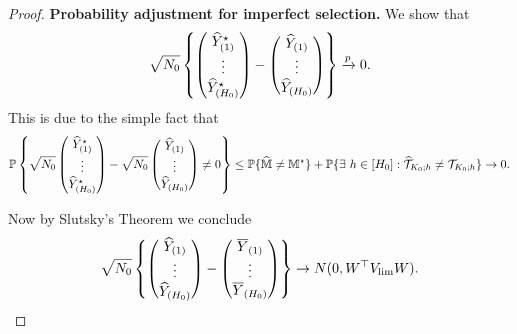 \documentclass[12pt]{article}
\begin{document}
\begin{proof}
\textbf{Probability adjustment for imperfect  selection.} We show that
\begin{align*}
    \sqrt{N_0}\left\{
        \begin{pmatrix}
        {\widehat{Y}}^\star_{(1)}\\
        \vdots \\
        {\widehat{Y}}^\star_{(H_0)}
        \end{pmatrix}
        - 
        \begin{pmatrix}
        {\widehat{Y}}_{(1)}\\
        \vdots \\
        {\widehat{Y}}_{(H_0)}
        \end{pmatrix} 
        \right\} \xrightarrow{p} 0.
\end{align*}
This is due to the simple fact that
\begin{align*}
    {\mathbb{P}}\left\{
        \sqrt{N_0}\begin{pmatrix}
        {\widehat{Y}}^\star_{(1)}\\
        \vdots \\
        {\widehat{Y}}^\star_{(H_0)}
        \end{pmatrix}
        - 
        \sqrt{N_0}\begin{pmatrix}
        {\widehat{Y}}_{(1)}\\
        \vdots \\
        {\widehat{Y}}_{(H_0)}
        \end{pmatrix} \neq 0
        \right\} \le {\mathbb{P}}\{\widehat{{\mathbb{M}}} \neq {\mathbb{M}}^\star\} + {\mathbb{P}}\{\exists~h \in [H_0]: \widehat{{\mathcal{T}}}_{K_0;h} \neq {{\mathcal{T}}}_{K_0;h}\} \to 0.
\end{align*}

Now by Slutsky's Theorem we conclude
\begin{align*}
        \sqrt{N_0}\left\{
        \begin{pmatrix}
        {\widehat{Y}}_{(1)}\\
        \vdots \\
        {\widehat{Y}}_{(H_0)}
        \end{pmatrix}
        - 
        \begin{pmatrix}
        \overline{Y}_{(1)}\\
        \vdots \\
        \overline{Y}_{(H_0)}
        \end{pmatrix} 
        \right\} \to N(0, W^\top V_{\lim} W).
\end{align*}

\end{proof}
\end{document}
